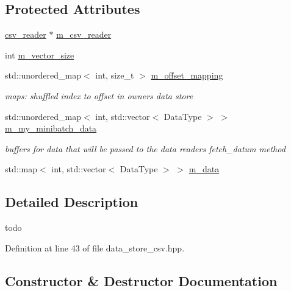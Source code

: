 \subsection*{Protected Attributes}
\begin{DoxyCompactItemize}
\item 
\hyperlink{classlbann_1_1csv__reader}{csv\+\_\+reader} $\ast$ \hyperlink{classlbann_1_1data__store__csv_a8920e09beb3e40e59e2858daf95a6cf9}{m\+\_\+csv\+\_\+reader}
\item 
int \hyperlink{classlbann_1_1data__store__csv_acf75e96923877e10c8ed499ec48f9320}{m\+\_\+vector\+\_\+size}
\item 
std\+::unordered\+\_\+map$<$ int, size\+\_\+t $>$ \hyperlink{classlbann_1_1data__store__csv_a4cb571710d2fd2a088bb55b7ac7ca29b}{m\+\_\+offset\+\_\+mapping}
\begin{DoxyCompactList}\small\item\em maps\+: shuffled index to offset in owner\textquotesingle{}s data store \end{DoxyCompactList}\item 
std\+::unordered\+\_\+map$<$ int, std\+::vector$<$ Data\+Type $>$ $>$ \hyperlink{classlbann_1_1data__store__csv_a456bbbf6d09c1ec04cd6260cf11007d8}{m\+\_\+my\+\_\+minibatch\+\_\+data}
\begin{DoxyCompactList}\small\item\em buffers for data that will be passed to the data reader\textquotesingle{}s fetch\+\_\+datum method \end{DoxyCompactList}\item 
std\+::map$<$ int, std\+::vector$<$ Data\+Type $>$ $>$ \hyperlink{classlbann_1_1data__store__csv_a8f0ac398b2ed53c36594ca1baaf4bde0}{m\+\_\+data}
\end{DoxyCompactItemize}


\subsection{Detailed Description}
todo 

Definition at line 43 of file data\+\_\+store\+\_\+csv.\+hpp.



\subsection{Constructor \& Destructor Documentation}
\mbox{\label{classlbann_1_1data__store__csv_add3e9e9c37f1cdf0e3dba00cc6f49507}} 
